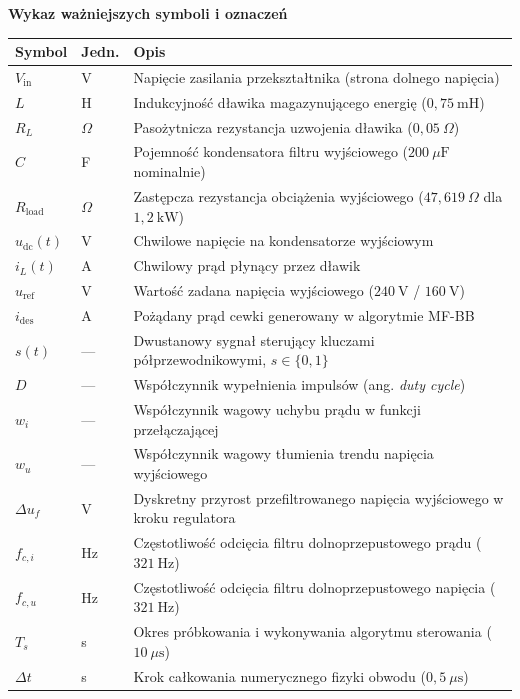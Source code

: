 \vspace{1.5em}
\textbf{\large Wykaz ważniejszych symboli i oznaczeń}
\vspace{0.8em}

\begin{tabular}{lll}
    \textbf{Symbol} & \textbf{Jedn.} & \textbf{Opis} \\
    \midrule
    $V_{\mathrm{in}}$ & V & Napięcie zasilania przekształtnika (strona dolnego napięcia) \\
    $L$ & H & Indukcyjność dławika magazynującego energię ($0{,}75~\mathrm{mH}$) \\
    $R_L$ & $\Omega$ & Pasożytnicza rezystancja uzwojenia dławika ($0{,}05~\Omega$) \\
    $C$ & F & Pojemność kondensatora filtru wyjściowego ($200~\mu\mathrm{F}$ nominalnie) \\
    $R_{\mathrm{load}}$ & $\Omega$ & Zastępcza rezystancja obciążenia wyjściowego ($47{,}619~\Omega$ dla $1{,}2~\mathrm{kW}$) \\
    $u_{\mathrm{dc}}(t)$ & V & Chwilowe napięcie na kondensatorze wyjściowym \\
    $i_L(t)$ & A & Chwilowy prąd płynący przez dławik \\
    $u_{\mathrm{ref}}$ & V & Wartość zadana napięcia wyjściowego ($240~\mathrm{V}$ / $160~\mathrm{V}$) \\
    $i_{\mathrm{des}}$ & A & Pożądany prąd cewki generowany w algorytmie MF-BB \\
    $s(t)$ & --- & Dwustanowy sygnał sterujący kluczami półprzewodnikowymi, $s \in \{0, 1\}$ \\
    $D$ & --- & Współczynnik wypełnienia impulsów (ang. \emph{duty cycle}) \\
    $w_i$ & --- & Współczynnik wagowy uchybu prądu w funkcji przełączającej \\
    $w_u$ & --- & Współczynnik wagowy tłumienia trendu napięcia wyjściowego \\
    $\Delta u_f$ & V & Dyskretny przyrost przefiltrowanego napięcia wyjściowego w kroku regulatora \\
    $f_{c,i}$ & Hz & Częstotliwość odcięcia filtru dolnoprzepustowego prądu ($321~\mathrm{Hz}$) \\
    $f_{c,u}$ & Hz & Częstotliwość odcięcia filtru dolnoprzepustowego napięcia ($321~\mathrm{Hz}$) \\
    $T_s$ & s & Okres próbkowania i wykonywania algorytmu sterowania ($10~\mu\mathrm{s}$) \\
    $\Delta t$ & s & Krok całkowania numerycznego fizyki obwodu ($0{,}5~\mu\mathrm{s}$) \\

\end{tabular}
